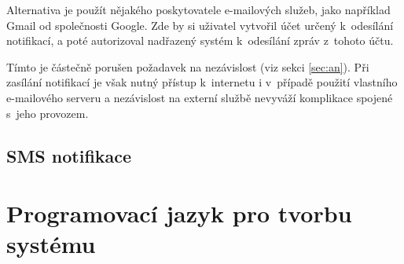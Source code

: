Alternativa je použít nějakého poskytovatele e-mailových služeb, jako například Gmail od společnosti Google. Zde by si uživatel vytvořil účet určený k~odesílání notifikací, a poté autorizoval nadřazený systém k~odesílání zpráv z~tohoto účtu. 

Tímto je částečně porušen požadavek na nezávislost (viz sekci \ref{sec:an}). Při zasílání notifikací je však nutný přístup k~internetu i v~případě použití vlastního e-mailového serveru a nezávislost na externí službě nevyváží komplikace spojené s~jeho provozem.





\subsection{SMS notifikace}



\section{Programovací jazyk pro tvorbu systému}
\label{sec:an_lang}

